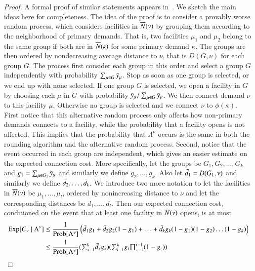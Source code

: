 \begin{proof}
  A formal proof of similar statements appears in~\cite{ChudakS04,
    ByrkaA10}. We sketch the main ideas here for completeness. The
  idea of the proof is to consider a provably worse random process,
  which considers facilities in ${\overline{N}}(\nu)$ by grouping them
  according to the neighborhood of primary demands. That is, two
  facilities $\mu_1$ and $\mu_2$ belong to the same group if both are
  in ${\overline{N}}(\kappa)$ for some primary demand $\kappa$. The groups are
  then ordered by nondecreasing average distance to $\nu$, that is
  $D(G,\nu)$ for each group $G$. The process first consider each group
  in this order and select a group $G$ independently with probability
  $\sum_{\mu\in G}{\bar y}_{\mu}$. Stop as soon as one group is selected,
  or we end up with none selected. If one group $G$ is selected, we
  open a facility in $G$ by choosing each $\mu$ in $G$ with
  probability ${\bar y}_{\mu}/\sum_{\mu\in G} {\bar y}_{\mu}$. We then
  connect demand $\nu$ to this facility $\mu$. Otherwise no group is
  selected and we connect $\nu$ to $\phi(\kappa)$. First notice that
  this alternative random process only affects how non-primary demands
  connects to a facility, while the probability that a facility opens
  is not affected. This implies that the probability that
  $\Lambda^\nu$ occurs is the same in both the rounding algorithm and
  the alternative random process. Second, notice that the event
  occurred in each group are independent, which gives an easier
  estimate on the expected connection cost. More specifically, let the
  groups be $G_1, G_2, \ldots, G_k$ and $g_1 = \sum_{\mu \in G_1}
  {\bar y}_{\mu}$ and similarly we define $g_2,\ldots,g_k$. Also let
  ${\bar d}_1 = D(G_1, \nu)$ and similarly we define ${\bar d}_2, \ldots,
  {\bar d}_k$. We introduce two more notation to let the facilities in
  ${\overline{N}}(\nu)$ be $\mu_1, \ldots, \mu_l$, ordered by nonincreasing
  distance to $\nu$ and let the corresponding distances be $d_1,
  \ldots, d_l$. Then our expected connection cost, conditioned on the
  event that at least one facility in ${\overline{N}}(\nu)$ opens, is at most
\begin{align*}
  \Exp[C_\nu \mid \Lambda^\nu] &\leq \frac{1}{\Prob[\Lambda^\nu]}
  \left( \bard_1 g_1 + \bard_2 g_2 (1-g_1) + \ldots + \bard_k g_k
    (1-g_1) (1-g_2) \ldots (1-g_k) \right)
  \\
  &\leq \frac{1}{\Prob[\Lambda^\nu]} (\textstyle{\sum_{s=1}^k} \bard_s
  g_s)(\textstyle{\sum_{t=1}^k} g_t \textstyle{\prod_{z=1}^{t-1}}
  (1-g_z))
  \\

\end{align*}
\end{proof}
